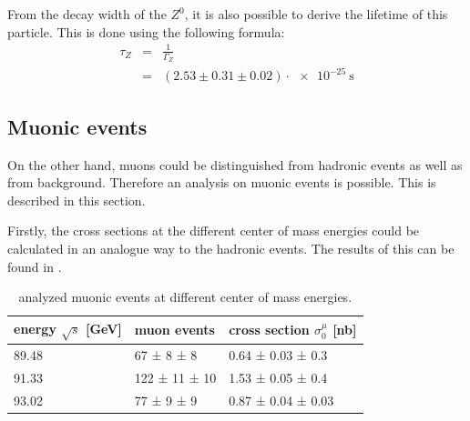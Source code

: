 \documentclass[epj,nopacs]{svjour}
\begin{document}
From the decay width of the $Z^0$, it is also possible to derive the lifetime
of this particle. This is done using the following formula:
\begin{eqnarray}
τ_Z &=& \frac{1}{Γ_Z}\\
\nonumber &=& (2.53 \pm 0.31 \pm 0.02) \cdot \SI{e-25}{\second}
\end{eqnarray}

\subsection{Muonic events}

On the other hand, muons could be distinguished from hadronic events as well as
from background. Therefore an analysis on muonic events is possible. This is
described in this section.

Firstly, the cross sections at the different center of mass energies could be
calculated in an analogue way to the hadronic events. The results of this can
be found in .

\begin{table}[h]
\begin{center}
\begin{tabular}{|l|l|l|}
\hline
energy $\sqrt{s}$ [\si{\GeV}] & muon events & cross section $σ_0^μ$ [\si{\nano\barn}]\\
\hline
89.48 & \phantom{0}67 ± \phantom{0}8 ± \phantom{0}8  & 0.64 ± 0.03 ± 0.3 \\
91.33 & 122 ± 11 ± 10 & 1.53 ± 0.05 ± 0.4 \\
93.02 & \phantom{0}77 ± \phantom{0}9 ± \phantom{0}9 & 0.87 ± 0.04 ± 0.03 \\
\hline
\end{tabular}
\vspace*{0.3cm}
\caption{\baselineskip=0.38cm analyzed muonic events at different center of mass
energies.}
\label{tab:muon_events}
\end{center}
\vspace*{-0.5cm}
\end{table}
\end{document}
